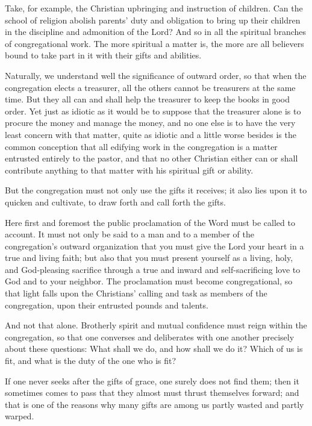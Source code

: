 Take, for example, the Christian upbringing and instruction of children. Can the school of religion abolish parents’ duty and obligation to bring up their children in the discipline and admonition of the Lord? And so in all the spiritual branches of congregational work. The more spiritual a matter is, the more are all believers bound to take part in it with their gifts and abilities.

Naturally, we understand well the significance of outward order, so that when the congregation elects a treasurer, all the others cannot be treasurers at the same time. But they all can and shall help the treasurer to keep the books in good order. Yet just as idiotic as it would be to suppose that the treasurer alone is to procure the money and manage the money, and no one else is to have the very least concern with that matter, quite as idiotic and a little worse besides is the common conception that all edifying work in the congregation is a matter entrusted entirely to the pastor, and that no other Christian either can or shall contribute anything to that matter with his spiritual gift or ability.

But the congregation must not only use the gifts it receives; it also lies upon it to quicken and cultivate, to draw forth and call forth the gifts.

Here first and foremost the public proclamation of the Word must be called to account. It must not only be said to a man and to a member of the congregation’s outward organization that you must give the Lord your heart in a true and living faith; but also that you must present yourself as a living, holy, and God-pleasing sacrifice through a true and inward and self-sacrificing love to God and to your neighbor. The proclamation must become congregational, so that light falls upon the Christians’ calling and task as members of the congregation, upon their entrusted pounds and talents.

And not that alone. Brotherly spirit and mutual confidence must reign within the congregation, so that one converses and deliberates with one another precisely about these questions: What shall we do, and how shall we do it? Which of us is fit, and what is the duty of the one who is fit?

If one never seeks after the gifts of grace, one surely does not find them; then it sometimes comes to pass that they almost must thrust themselves forward; and that is one of the reasons why many gifts are among us partly wasted and partly warped.

